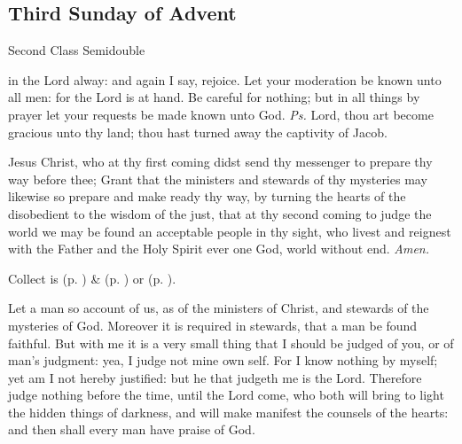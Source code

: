 \subsection{Third Sunday of Advent}
\begin{inhead}
{Second Class Semidouble}
\end{inhead}


\introit
{} in the Lord alway: and again I say, rejoice. Let your moderation be known unto all men: for the Lord is at hand. Be careful for nothing; but in all things by prayer let your requests be made known unto God. \textit{Ps.} Lord, thou art become gracious unto thy land; thou hast turned away the captivity of Jacob.

\collect
{} Jesus Christ, who at thy first coming didst send thy messenger to prepare thy way before thee; Grant that the ministers and stewards of thy mysteries may likewise so prepare and make ready thy way, by turning the hearts of the disobedient to the wisdom of the just, that at thy second coming to judge the world we may be found an acceptable people in thy sight, who livest and reignest with the Father and the Holy Spirit ever one God, world without end. \textit{Amen.}
\begin{rubric}
     Collect is  (p. \pageref{SPMaryInAdvent}) \&   (p. \pageref{SPAgainst}) or  (p. \pageref{SPChiefBishop}).
\end{rubric}
 Let a man so account of us, as of the ministers of Christ, and stewards of the mysteries of God. Moreover it is required in stewards, that a man be found faithful. But with me it is a very small thing that I should be judged of you, or of man's judgment: yea, I judge not mine own self. For I know nothing by myself; yet am I not hereby justified: but he that judgeth me is the Lord. Therefore judge nothing before the time, until the Lord come, who both will bring to light the hidden things of darkness, and will make manifest the counsels of the hearts: and then shall every man have praise of God.


